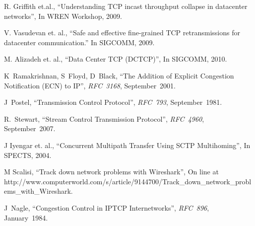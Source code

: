 \documentclass[12pt]{article}
\begin{document}
\begin{thebibliography}{9}

R. Griffith et.al.,
  ``Understanding TCP incast throughput collapse in datacenter networks'', 
  In WREN Workshop, 2009.
  
  V. Vasudevan et. al.,
  ``Safe and effective fine-grained TCP retransmissions for datacenter communication.''
 In SIGCOMM, 2009.
 
 M. Alizadeh et. al.,
 ``Data Center TCP (DCTCP)'',
 In SIGCOMM, 2010.
 
  K~Ramakrishnan, S~Floyd, D~Black,
  ``The Addition of Explicit Congestion Notification (ECN) to IP'',
  \textit{RFC~3168},
  September~2001.
 
  J~Postel,
  ``Transmission Control Protocol'',
  \textit{RFC~793},
  September~1981.
  
 R.~Stewart,
  ``Stream Control Transmission Protocol'',
  \textit{RFC~4960},
 September~2007.
 
 J Iyengar et. al.,
 ``Concurrent Multipath Transfer Using SCTP Multihoming'',
 In SPECTS, 2004.
 
 M Scalisi,
 ``Track down network problems with Wireshark'',
 On line at http://www.computerworld.com/s/article/9144700/Track\_down\_network\_problems\_with\_Wireshark.
 
   J~Nagle,
 ``Congestion Control in IP\/TCP Internetworks'',
  \textit{RFC~896},
 January~1984.
 
\end{thebibliography}




\end{document}
